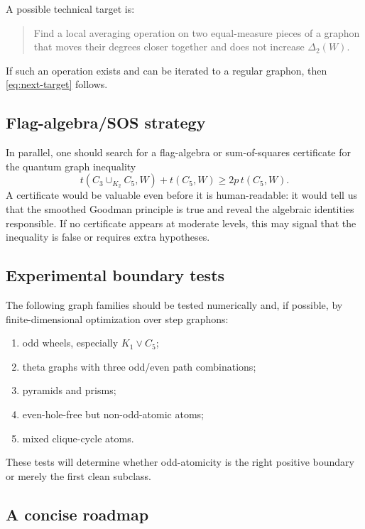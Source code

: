 \documentclass[11pt]{article}
\theoremstyle{definition}
\begin{document}
A possible technical target is:
\begin{quote}
Find a local averaging operation on two equal-measure pieces of a graphon that moves their degrees closer together and does not increase $\Delta_2(W)$.
\end{quote}
If such an operation exists and can be iterated to a regular graphon, then \eqref{eq:next-target} follows.

\subsection{Flag-algebra/SOS strategy}

In parallel, one should search for a flag-algebra or sum-of-squares certificate for the quantum graph inequality
\begin{equation}\label{eq:quantum-graph-SG2}
  t(C_3\cup_{K_2}C_5,W)+t(C_5,W)
  \ge 2p\,t(C_5,W).
\end{equation}
A certificate would be valuable even before it is human-readable: it would tell us that the smoothed Goodman principle is true and reveal the algebraic identities responsible.  If no certificate appears at moderate levels, this may signal that the inequality is false or requires extra hypotheses.

\subsection{Experimental boundary tests}

The following graph families should be tested numerically and, if possible, by finite-dimensional optimization over step graphons:
\begin{enumerate}[label=(\roman*)]
\item odd wheels, especially $K_1\vee C_5$;
\item theta graphs with three odd/even path combinations;
\item pyramids and prisms;
\item even-hole-free but non-odd-atomic atoms;
\item mixed clique-cycle atoms.
\end{enumerate}
These tests will determine whether odd-atomicity is the right positive boundary or merely the first clean subclass.

\subsection{A concise roadmap}
\end{document}
